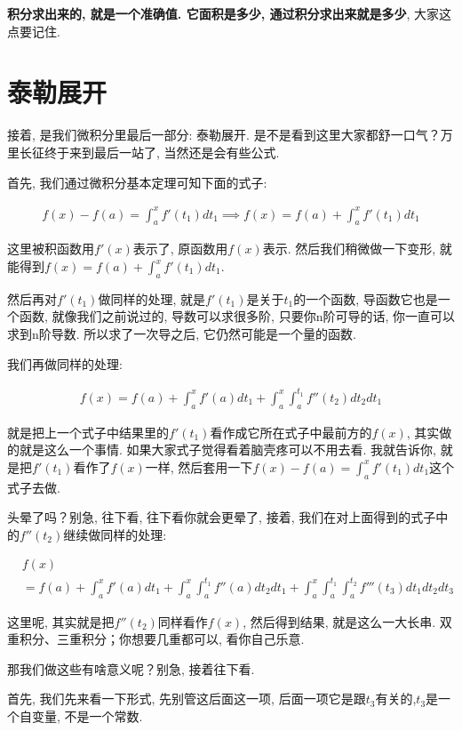 \textbf{积分求出来的, 就是一个准确值. 它面积是多少, 通过积分求出来就是多少}, 大家这点要记住. 

\section{泰勒展开}

接着, 是我们微积分里最后一部分: 泰勒展开. 是不是看到这里大家都舒一口气？万里长征终于来到最后一站了, 当然还是会有些公式. 

首先, 我们通过微积分基本定理可知下面的式子: 

\begin{align*}
  f(x) - f(a)  = \int_a^xf'(t_1)dt_1 \implies f(x) = f(a) + \int_a^xf'(t_1)dt_1
\end{align*}

这里被积函数用$f'(x)$表示了, 原函数用$f(x)$表示. 然后我们稍微做一下变形, 就能得到$f(x) = f(a) + \int_a^xf'(t_1)dt_1$. 

然后再对$f'(t_1)$做同样的处理, 就是$f'(t_1)$是关于$t_1$的一个函数, 导函数它也是一个函数, 就像我们之前说过的, 导数可以求很多阶, 只要你n阶可导的话, 你一直可以求到n阶导数. 所以求了一次导之后, 它仍然可能是一个量的函数. 

我们再做同样的处理: 

\begin{align*}
  f(x) = f(a) + \int_a^xf'(a)dt_1 + \int_a^x \int_a^{t_1} f''(t_2)dt_2dt_1
\end{align*}

就是把上一个式子中结果里的$f'(t_1)$看作成它所在式子中最前方的$f(x)$, 其实做的就是这么一个事情. 如果大家式子觉得看着脑壳疼可以不用去看. 我就告诉你, 就是把$f'(t_1)$看作了$f(x)$一样, 然后套用一下$f(x) - f(a)  = \int_a^xf'(t_1)dt_1 $这个式子去做. 

头晕了吗？别急, 往下看, 往下看你就会更晕了, 接着, 我们在对上面得到的式子中的$f''(t_2)$继续做同样的处理: 

\begin{align*}
  & f(x) \\ & = f(a)+\int_a^xf'(a)dt_1 + \int_a^x \int_a^{t_1} f''(a)dt_2dt_1+\int_a^x\int_a^{t_1}\int_a^{t_2}f'''(t_3)dt_1dt_2dt_3
\end{align*}

这里呢, 其实就是把$f''(t_2)$同样看作$f(x)$, 然后得到结果, 就是这么一大长串. 双重积分、三重积分；你想要几重都可以, 看你自己乐意. 

那我们做这些有啥意义呢？别急, 接着往下看. 

首先, 我们先来看一下形式, 先别管这后面这一项, 后面一项它是跟$t_3$有关的,$t_3$是一个自变量, 不是一个常数. 

